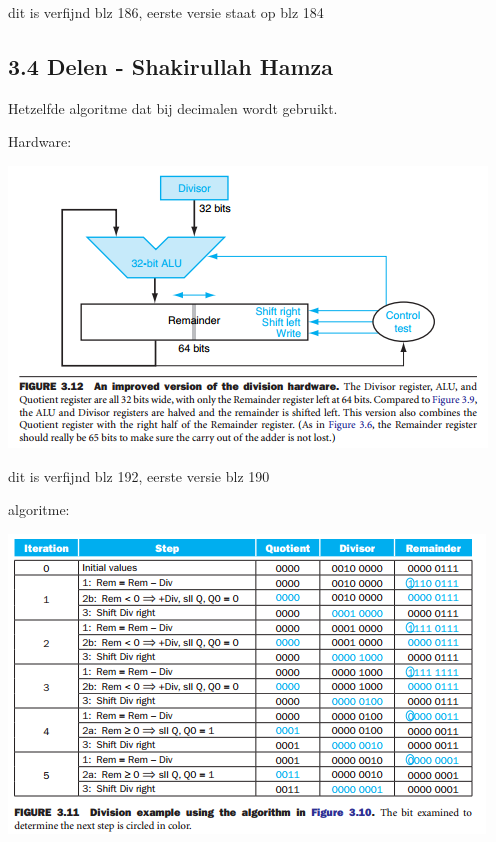 dit is verfijnd blz 186, eerste versie staat op blz 184

\subsection{3.4 Delen - Shakirullah Hamza}							
												       
\begin{figure}
\end{figure}


Hetzelfde algoritme dat bij decimalen wordt gebruikt.

Hardware:

\includegraphics{3}

dit is verfijnd blz 192, eerste versie blz 190

algoritme:

\includegraphics{4}

